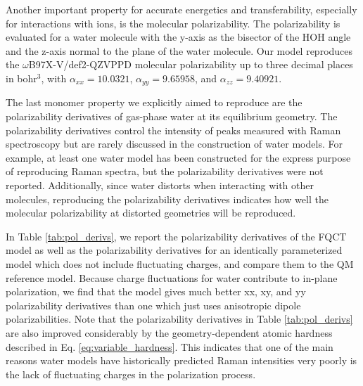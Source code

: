 \documentclass[journal=jctcce,manuscript=article]{achemso}
\begin{document}
Another important property for accurate energetics and transferability, especially for interactions with ions, is the molecular polarizability. The polarizability is evaluated for a water molecule with the y-axis as the bisector of the HOH angle and the z-axis normal to the plane of the water molecule. Our model reproduces the $\omega$B97X-V/def2-QZVPPD molecular polarizability  up to three decimal places in bohr$^3$, with $\alpha_{xx}=10.0321$, $\alpha_{yy}=9.65958$, and $\alpha_{zz}=9.40921$. 

The last monomer property we explicitly aimed to reproduce are the polarizability derivatives of gas-phase water at its equilibrium geometry. The polarizability derivatives control the intensity of peaks measured with Raman spectroscopy but are rarely discussed in the construction of water models. For example, at least one water model has been constructed for the express purpose of reproducing Raman spectra\cite{sidler2018efficient}, but the polarizability derivatives were not reported. Additionally, since water distorts when interacting with other molecules, reproducing the polarizability derivatives indicates how well the molecular polarizability at distorted geometries will be reproduced. 

In Table \ref{tab:pol_derivs}, we report the polarizability derivatives of the FQCT model as well as the polarizability derivatives for an identically parameterized model which does not include fluctuating charges, and compare them to the QM reference model. Because charge fluctuations for water contribute to in-plane polarization, we find that the model gives much better xx, xy, and yy polarizability derivatives than one which just uses anisotropic dipole polarizabilities. Note that the polarizability derivatives in Table \ref{tab:pol_derivs} are also improved considerably by the geometry-dependent atomic hardness described in Eq. \ref{eq:variable_hardness}. This indicates that one of the main reasons water models have historically predicted Raman intensities very poorly\cite{hamm20142d} is the lack of fluctuating charges in the polarization process. 
\end{document}
